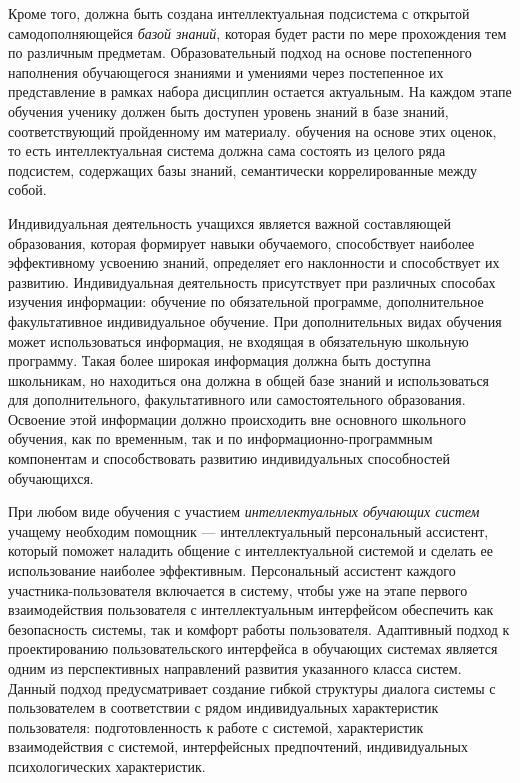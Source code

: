 Кроме того, должна быть создана интеллектуальная подсистема с открытой самодополняющейся \textit{базой знаний}, которая будет расти по мере прохождения тем по различным предметам. Образовательный подход на основе постепенного наполнения обучающегося знаниями и умениями через постепенное их представление в рамках набора дисциплин остается актуальным. На каждом этапе обучения ученику должен быть доступен уровень знаний в базе знаний, соответствующий пройденному им материалу. обучения на основе этих оценок, то есть интеллектуальная система должна сама состоять из целого ряда подсистем, содержащих базы знаний, семантически коррелированные между собой.

Индивидуальная деятельность учащихся является важной составляющей образования, которая формирует навыки обучаемого, способствует наиболее эффективному усвоению знаний, определяет его наклонности и способствует их развитию. Индивидуальная деятельность присутствует при различных способах изучения информации: обучение по обязательной программе, дополнительное факультативное индивидуальное обучение. При дополнительных видах обучения может использоваться информация, не входящая в обязательную школьную программу. Такая более широкая информация должна быть доступна школьникам, но находиться она должна в общей базе знаний и использоваться для дополнительного, факультативного или самостоятельного образования. Освоение этой информации должно происходить вне основного школьного обучения, как по временным, так и по информационно-программным компонентам и способствовать развитию индивидуальных способностей обучающихся.

При любом виде обучения  с участием \textit{интеллектуальных обучающих систем} учащему необходим помощник --- интеллектуальный персональный ассистент, который  поможет наладить общение с интеллектуальной системой и сделать ее использование наиболее эффективным. Персональный ассистент каждого участника-пользователя включается в систему, чтобы уже на этапе первого взаимодействия пользователя с интеллектуальным интерфейсом обеспечить как безопасность системы, так и комфорт работы пользователя. Адаптивный подход к проектированию пользовательского интерфейса в обучающих системах является одним из перспективных направлений развития указанного класса систем. Данный подход предусматривает создание гибкой структуры диалога системы с пользователем в соответствии с рядом индивидуальных характеристик пользователя: подготовленность к работе с системой, характеристик взаимодействия с системой, интерфейсных предпочтений, индивидуальных психологических характеристик.

